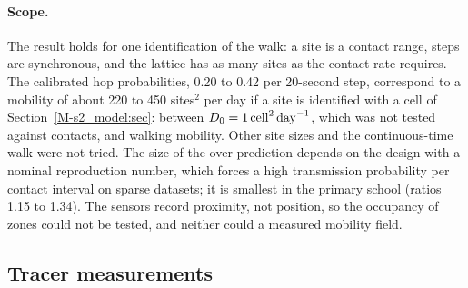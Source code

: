 \paragraph{Scope.}
The result holds for one identification of the walk: a site is a contact range, steps are synchronous, and the
lattice has as many sites as the contact rate requires. The calibrated hop probabilities, 0.20 to 0.42 per
20-second step, correspond to a mobility of about 220 to 450 sites$^2$ per day if a site is identified with a
cell of Section~\ref{M-s2_model:sec}: between $D_0=1\,\mathrm{cell}^2\,\mathrm{day}^{-1}$, which was not tested against contacts, and walking
mobility. Other site sizes and the continuous-time walk were not tried. The size of the over-prediction depends on the design with a nominal reproduction number, which
forces a high transmission probability per contact interval on sparse datasets; it is smallest in the primary
school (ratios 1.15 to 1.34). The sensors record proximity, not position, so the occupancy of zones could not
be tested, and neither could a measured mobility field.

\subsection{Tracer measurements}\label{s8b_evidence:sec:tracerdetail}

